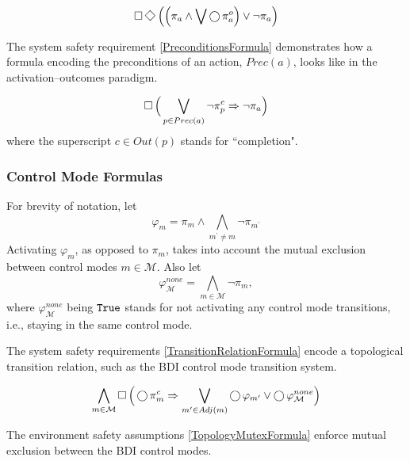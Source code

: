 \begin{equation}\label{ActionFairnessConditionsFormula}
	\LTLG \LTLF \Big( \Big( \pi_a \wedge \bigvee \LTLX \pi_a^o \Big) \vee \lnot \pi_a \Big)
\end{equation}

The system safety requirement \eqref{PreconditionsFormula} demonstrates how a formula encoding the preconditions of an action, $Prec(a)$, looks like in the activation--outcomes paradigm.

\begin{equation}\label{PreconditionsFormula}
	\operatorname{\Box} \Big( \bigvee \limits_{p \in Prec(a)} \lnot \pi_p^c \Rightarrow \lnot \pi_a \Big)
\end{equation}
where the superscript $c \in Out(p)$ stands for ``completion".


\subsubsection{Control Mode Formulas}

For brevity of notation, let $$\varphi_m = \pi_m \wedge \bigwedge_{m^\prime \neq m} \lnot \pi_{m^\prime}$$
Activating $\varphi_m$, as opposed to $\pi_m$, takes into account the mutual exclusion between control modes $m \in \mathcal{M}$.
Also let $$\varphi_\mathcal{M}^{none} = \bigwedge_{m \in \mathcal{M}} \lnot \pi_m,$$
where $\varphi_\mathcal{M}^{none}$ being $\mathtt{True}$ stands for not activating any control mode transitions, i.e., staying in the same control mode.

The system safety requirements \eqref{TransitionRelationFormula} encode a topological transition relation, such as the BDI control mode transition system.

\begin{equation}\label{TransitionRelationFormula}
	\bigwedge \limits_{m \in \mathcal{M}} \operatorname{\Box} \Big( \operatorname{\bigcirc} \pi_m^c \Rightarrow \bigvee \limits_{m^\prime \in Adj(m)} \operatorname{\bigcirc} \varphi_{m^\prime} \vee \operatorname{\bigcirc} \varphi_\mathcal{M}^{none} \Big)
\end{equation}

The environment safety assumptions \eqref{TopologyMutexFormula} enforce mutual exclusion between the BDI control modes.

